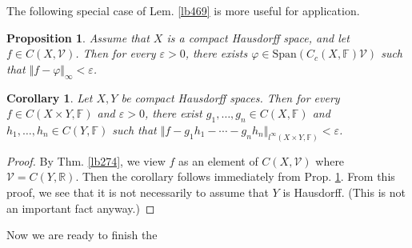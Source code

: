\documentclass[12pt,b5paper,notitlepage]{article}
\theoremstyle{definition}
\theoremstyle{plain}
\newtheorem{pp}[df]{Proposition}
\newtheorem{co}[df]{Corollary}
\newcommand{\mc}{\mathcal}
\newcommand{\Span}{\mathrm{Span}}
\newcommand{\Rbb}{\mathbb R}
\newcommand{\Fbb}{\mathbb F}
\newcommand{\eps}{\varepsilon}
\numberwithin{equation}{section}
\begin{document}
The following special case of Lem. \ref{lb469} is more useful for application.

\begin{pp}\label{lb470}
Assume that $X$ is a compact Hausdorff space, and let $f\in C(X,\mc V)$. Then for every $\eps>0$, there exists $\varphi\in\Span(C_c(X,\Fbb)\mc V)$ such that $\Vert f-\varphi\Vert_\infty<\eps$.
\end{pp}



\begin{co}\label{lb471}
Let $X,Y$ be compact Hausdorff spaces. Then for every $f\in C(X\times Y,\Fbb)$ and $\eps>0$, there exist $g_1,\dots,g_n\in C(X,\Fbb)$ and $h_1,\dots,h_n\in C(Y,\Fbb)$ such that $\Vert f-g_1h_1-\cdots-g_nh_n\Vert_{l^\infty(X\times Y,\Fbb)}<\eps$.
\end{co}


\begin{proof}
By Thm. \ref{lb274}, we view $f$ as an element of $C(X,\mc V)$ where $\mc V=C(Y,\Rbb)$. Then the corollary follows immediately from Prop. \ref{lb470}. From this proof, we see that it is not necessarily to assume that $Y$ is Hausdorff. (This is not an important fact anyway.)
\end{proof}



Now we are ready to finish the
\end{document}
